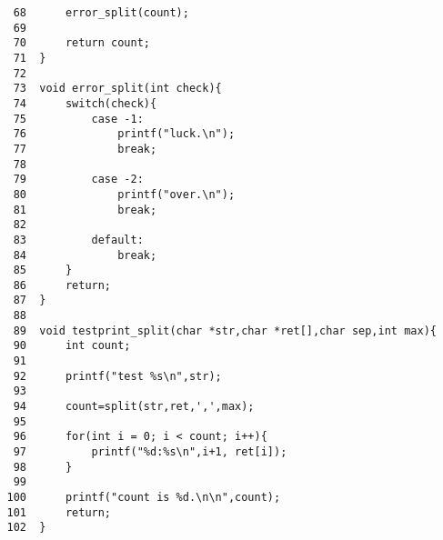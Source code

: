 \documentclass[a4j,11pt]{jarticle}
\begin{document}
{\begin{verbatim}
    68      error_split(count);
    69
    70      return count;
    71  }
    72
    73  void error_split(int check){
    74      switch(check){
    75          case -1:
    76              printf("luck.\n");
    77              break;
    78
    79          case -2:
    80              printf("over.\n");
    81              break;
    82
    83          default:
    84              break;
    85      }
    86      return;
    87  }
    88
    89  void testprint_split(char *str,char *ret[],char sep,int max){
    90      int count;
    91
    92      printf("test %s\n",str);
    93
    94      count=split(str,ret,',',max);
    95
    96      for(int i = 0; i < count; i++){
    97          printf("%d:%s\n",i+1, ret[i]);
    98      }
    99
   100      printf("count is %d.\n\n",count);
   101      return;
   102  }

\end{verbatim}
}  %
\end{document}

